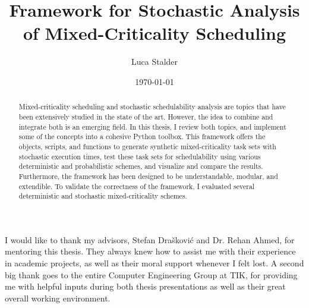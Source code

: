 \documentclass[a4paper,oneside]{csthesis}
\title{Framework for Stochastic Analysis of Mixed-Criticality Scheduling}
\author{Luca Stalder}
\institute{Computer Engineering and Networks Laboratory \\[2pt]
Department of Information Technology and Electrical Engineering \\[2pt]
ETH Zürich}
\date{\today}
\begin{document}
\frontmatter
\maketitle

\cleardoublepage

\begin{acknowledgements}
	I would like to thank my advisors, Stefan Drašković and Dr. Rehan Ahmed, for mentoring this thesis. They always knew how to assist me with their experience in academic projects, as well as their moral support whenever I felt lost. A second big thank goes to the entire Computer Engineering Group at TIK, for providing me with helpful inputs during both thesis presentations as well as their great overall working environment.
\end{acknowledgements}


\begin{abstract}
	Mixed-criticality scheduling and stochastic schedulability analysis are topics that have been extensively studied in the state of the art. However, the idea to combine and integrate both is an emerging field. In this thesis, I review both topics, and implement some of the concepts into a cohesive Python toolbox. This framework offers the objects, scripts, and functions to generate synthetic mixed-criticality task sets with stochastic execution times, test these task sets for schedulability using various deterministic and probabilistic schemes, and visualize and compare the results. Furthermore, the framework has been designed to be understandable, modular, and extendible. To validate the correctness of the framework, I evaluated several deterministic and stochastic mixed-criticality schemes.
\end{abstract}

\tableofcontents
\mainmatter

\end{document}
